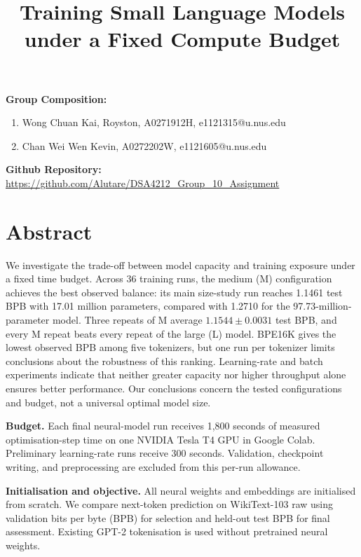 \documentclass[11pt]{article}
\begin{document}
\title{Training Small Language Models under a Fixed Compute Budget}
\date{}
\maketitle

{\bf Group Composition:}
\begin{enumerate}
\item Wong Chuan Kai, Royston, A0271912H, e1121315@u.nus.edu
\item Chan Wei Wen Kevin, A0272202W, e1121605@u.nus.edu
\end{enumerate}

{\bf Github Repository:} \url{https://github.com/Alutare/DSA4212_Group_10_Assignment}

\section*{Abstract}

\noindent
We investigate the trade-off between model capacity and training exposure under a fixed time budget. Across 36 training runs, the medium (M) configuration achieves the best observed balance: its main size-study run reaches 1.1461 test BPB with 17.01 million parameters, compared with 1.2710 for the 97.73-million-parameter model. Three repeats of M average $1.1544\pm0.0031$ test BPB, and every M repeat beats every repeat of the large (L) model. BPE16K gives the lowest observed BPB among five tokenizers,
but one run per tokenizer limits conclusions about the
robustness of this ranking. Learning-rate and batch experiments indicate that neither greater capacity nor higher throughput alone ensures better performance. Our conclusions concern the tested configurations and budget, not a universal optimal model size.

\par\vspace{0.4cm}

\noindent\textbf{Budget.} Each final neural-model run receives 1,800 seconds of measured optimisation-step time on one NVIDIA Tesla T4 GPU in Google Colab. Preliminary learning-rate runs receive 300 seconds. Validation, checkpoint writing, and preprocessing are excluded from this per-run allowance.

\par\vspace{0.4cm}

\noindent\textbf{Initialisation and objective.} All neural weights and embeddings are initialised from scratch. We compare next-token prediction on WikiText-103 raw using validation bits per byte (BPB) for selection and held-out test BPB for final assessment. Existing GPT-2 tokenisation is used without pretrained neural weights.
\end{document}
